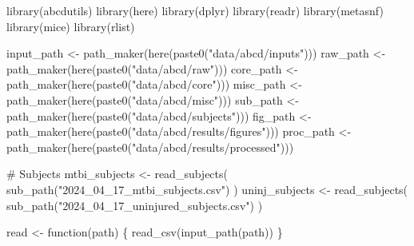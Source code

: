 \documentclass[
  letterpaper,
  DIV=11,
  numbers=noendperiod]{scrreprt}
\newenvironment{Shaded}{\begin{snugshade}}{\end{snugshade}}
\newcommand{\CommentTok}[1]{\textcolor[rgb]{0.37,0.37,0.37}{#1}}
\newcommand{\ControlFlowTok}[1]{\textcolor[rgb]{0.00,0.23,0.31}{#1}}
\newcommand{\FunctionTok}[1]{\textcolor[rgb]{0.28,0.35,0.67}{#1}}
\newcommand{\NormalTok}[1]{\textcolor[rgb]{0.00,0.23,0.31}{#1}}
\newcommand{\OtherTok}[1]{\textcolor[rgb]{0.00,0.23,0.31}{#1}}
\newcommand{\StringTok}[1]{\textcolor[rgb]{0.13,0.47,0.30}{#1}}
\begin{document}
\begin{Shaded}
\begin{Highlighting}[]
\FunctionTok{library}\NormalTok{(abcdutils)}
\FunctionTok{library}\NormalTok{(here)}
\FunctionTok{library}\NormalTok{(dplyr)}
\FunctionTok{library}\NormalTok{(readr)}
\FunctionTok{library}\NormalTok{(metasnf)}
\FunctionTok{library}\NormalTok{(mice)}
\FunctionTok{library}\NormalTok{(rlist)}

\NormalTok{input\_path }\OtherTok{\textless{}{-}} \FunctionTok{path\_maker}\NormalTok{(}\FunctionTok{here}\NormalTok{(}\FunctionTok{paste0}\NormalTok{(}\StringTok{"data/abcd/inputs"}\NormalTok{)))}
\NormalTok{raw\_path }\OtherTok{\textless{}{-}} \FunctionTok{path\_maker}\NormalTok{(}\FunctionTok{here}\NormalTok{(}\FunctionTok{paste0}\NormalTok{(}\StringTok{"data/abcd/raw"}\NormalTok{)))}
\NormalTok{core\_path }\OtherTok{\textless{}{-}} \FunctionTok{path\_maker}\NormalTok{(}\FunctionTok{here}\NormalTok{(}\FunctionTok{paste0}\NormalTok{(}\StringTok{"data/abcd/core"}\NormalTok{)))}
\NormalTok{misc\_path }\OtherTok{\textless{}{-}} \FunctionTok{path\_maker}\NormalTok{(}\FunctionTok{here}\NormalTok{(}\FunctionTok{paste0}\NormalTok{(}\StringTok{"data/abcd/misc"}\NormalTok{)))}
\NormalTok{sub\_path }\OtherTok{\textless{}{-}} \FunctionTok{path\_maker}\NormalTok{(}\FunctionTok{here}\NormalTok{(}\FunctionTok{paste0}\NormalTok{(}\StringTok{"data/abcd/subjects"}\NormalTok{)))}
\NormalTok{fig\_path }\OtherTok{\textless{}{-}} \FunctionTok{path\_maker}\NormalTok{(}\FunctionTok{here}\NormalTok{(}\FunctionTok{paste0}\NormalTok{(}\StringTok{"data/abcd/results/figures"}\NormalTok{)))}
\NormalTok{proc\_path }\OtherTok{\textless{}{-}} \FunctionTok{path\_maker}\NormalTok{(}\FunctionTok{here}\NormalTok{(}\FunctionTok{paste0}\NormalTok{(}\StringTok{"data/abcd/results/processed"}\NormalTok{)))}

\CommentTok{\# Subjects}
\NormalTok{mtbi\_subjects }\OtherTok{\textless{}{-}} \FunctionTok{read\_subjects}\NormalTok{(}
    \FunctionTok{sub\_path}\NormalTok{(}\StringTok{"2024\_04\_17\_mtbi\_subjects.csv"}\NormalTok{)}
\NormalTok{)}
\NormalTok{uninj\_subjects }\OtherTok{\textless{}{-}} \FunctionTok{read\_subjects}\NormalTok{(}
    \FunctionTok{sub\_path}\NormalTok{(}\StringTok{"2024\_04\_17\_uninjured\_subjects.csv"}\NormalTok{)}
\NormalTok{)}

\NormalTok{read }\OtherTok{\textless{}{-}} \ControlFlowTok{function}\NormalTok{(path) \{}
    \FunctionTok{read\_csv}\NormalTok{(}\FunctionTok{input\_path}\NormalTok{(path))}
\NormalTok{\}}
\end{Highlighting}
\end{Shaded}
\end{document}
